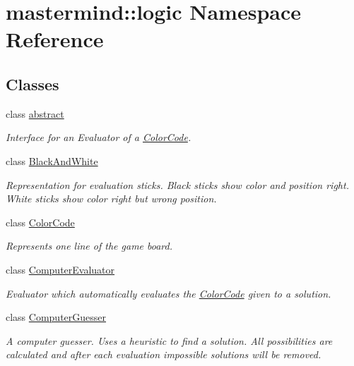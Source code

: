 \hypertarget{namespacemastermind_1_1logic}{}\section{mastermind\+:\+:logic Namespace Reference}
\label{namespacemastermind_1_1logic}
\subsection*{Classes}
\begin{DoxyCompactItemize}
\item 
class \hyperlink{classmastermind_1_1logic_1_1abstract}{abstract}
\begin{DoxyCompactList}\small\item\em Interface for an Evaluator of a \hyperlink{classmastermind_1_1logic_1_1_color_code}{Color\+Code}. \end{DoxyCompactList}\item 
class \hyperlink{classmastermind_1_1logic_1_1_black_and_white}{Black\+And\+White}
\begin{DoxyCompactList}\small\item\em Representation for evaluation sticks. Black sticks show color and position right. White sticks show color right but wrong position. \end{DoxyCompactList}\item 
class \hyperlink{classmastermind_1_1logic_1_1_color_code}{Color\+Code}
\begin{DoxyCompactList}\small\item\em Represents one line of the game board. \end{DoxyCompactList}\item 
class \hyperlink{classmastermind_1_1logic_1_1_computer_evaluator}{Computer\+Evaluator}
\begin{DoxyCompactList}\small\item\em Evaluator which automatically evaluates the \hyperlink{classmastermind_1_1logic_1_1_color_code}{Color\+Code} given to a solution. \end{DoxyCompactList}\item 
class \hyperlink{classmastermind_1_1logic_1_1_computer_guesser}{Computer\+Guesser}
\begin{DoxyCompactList}\small\item\em A computer guesser. Uses a heuristic to find a solution. All possibilities are calculated and after each evaluation impossible solutions will be removed. \end{DoxyCompactList}\item 

\end{DoxyCompactItemize}
